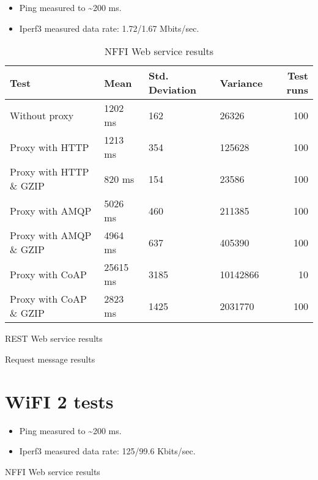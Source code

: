 \begin{appendices}
\begin{itemize}
	\item Ping measured to \textasciitilde 200 ms.
	\item Iperf3 measured data rate: 1.72/1.67 Mbits/sec.
\end{itemize}

\begin{table}[H]
\begin{tabular}{llllr}
\hline
\hline
 Test                   &   Mean &   Std. Deviation &   Variance &   Test runs \\
\hline
  Without proxy & 1202 ms & 162 & 26326 & 100 \\
  Proxy with HTTP & 1213 ms & 354 & 125628 & 100 \\
  Proxy with HTTP \& GZIP & 820 ms & 154 & 23586 & 100 \\
  Proxy with AMQP & 5026 ms & 460 & 211385 & 100 \\
  Proxy with AMQP \& GZIP & 4964 ms & 637 & 405390 & 100\\
  Proxy with CoAP & 25615 ms & 3185 & 10142866 & 10 \\
  Proxy with CoAP \& GZIP & 2823 ms & 1425 & 2031770 & 100 \\
\end{tabular}
\caption{NFFI Web service results}
\end{table}


\begin{table}[H]

\caption{REST Web service results}
\end{table}

\begin{table}[H]

\caption{Request message results}
\end{table}


\section{WiFI 2 tests}

\begin{itemize}
	\item Ping measured to \textasciitilde 200 ms.
	\item Iperf3 measured data rate: 125/99.6 Kbits/sec.
\end{itemize}

\begin{table}[H]

\caption{NFFI Web service results}
\end{table}



\end{appendices}
